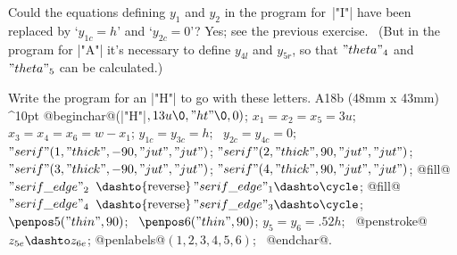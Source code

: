 {{{{\dangerexercise Could the equations defining $y_1$ and $y_2$ in the program
for~|"I"| have been replaced by `$y_{1c}=h$' and `$y_{2c}=0$'?
\answer Yes; see the previous exercise. \ (But in the program for |"A"|
it's necessary to define $y_{4l}$ and $y_{5r}$, so that $"theta"_4$
and~$"theta"_5$ can be calculated.)

\dangerexercise Write the program for an |"H"| to go with these letters.
\answer \rightfig A18b (48mm x 43mm) ^10pt
@beginchar@\kern1pt(|"H"|$,13u\0,"ht"\0,0)$;\parbreak
$x_1=x_2=x_5=3u$;\parbreak
$x_3=x_4=x_6=w-x_1$;\parbreak
$y_{1c}=y_{3c}=h$; \ $y_{2c}=y_{4c}=0$;\parbreak
$"serif"(1,"thick",-90,"jut","jut")$;\parbreak
$"serif"(2,"thick",90,"jut","jut")$;\parbreak
$"serif"(3,"thick",-90,"jut","jut")$;\parbreak
$"serif"(4,"thick",90,"jut","jut")$;\parbreak
@fill@ $"serif\_edge"_2$\parbreak
\quad$\dashto{\rm reverse}\,"serif\_edge"_1\dashto\cycle$;\parbreak
@fill@ $"serif\_edge"_4$\parbreak
\quad$\dashto{\rm reverse}\,"serif\_edge"_3\dashto\cycle$;\parbreak
$\penpos5("thin",90)$; \ $\penpos6("thin",90)$;\parbreak
$y_5=y_6=.52h$; \ @penstroke@ $z_{5e}\dashto z_{6e}$;\parbreak
@penlabels@$(1,2,3,4,5,6)$; \ @endchar@.

}}}}
